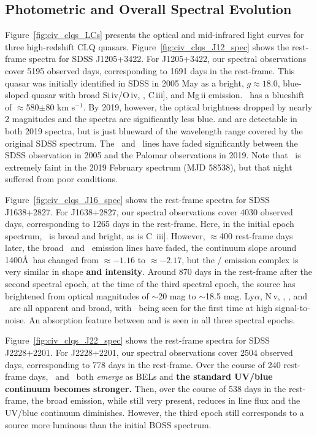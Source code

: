 \documentclass[fleqn,usenatbib]{mnras}
\begin{document}
\subsection{Photometric and Overall Spectral Evolution}
Figure~\ref{fig:civ_clqs_LCs} presents the optical and mid-infrared light
curves for three high-redshift CLQ quasars.
Figure~\ref{fig:civ_clqs_J12_spec} shows the rest-frame spectra for
SDSS J1205+3422.  For J1205+3422, our spectral observations cover 5195
observed days, corresponding to 1691 days in the rest-frame. This
quasar was initially identified in SDSS in 2005 May as a bright, $g
\approx 18.0$, blue-sloped quasar with broad Si\,{\sc iv}/O\,{\sc iv},
\civ, C\,{\sc iii}], and Mg\,{\sc ii} emission.  \civ\ has a blueshift of
$\approx$580$\pm$80 km s$^{-1}$.  By 2019, however, the optical
brightness dropped by nearly 2 magnitudes and the spectra are
significantly less blue.  \lya and \nv are detectable in both 2019
spectra, but is just blueward of the wavelength range covered by the
original SDSS spectrum. The \civ\ and \ciii\ lines have faded
significantly between the SDSS observation in 2005 and the Palomar
observations in 2019.  Note that \civ\ is extremely faint in the 2019
February spectrum (MJD 58538), but that night suffered from poor conditions.

Figure~\ref{fig:civ_clqs_J16_spec} shows the rest-frame spectra for
SDSS J1638+2827.  For J1638+2827, our spectral observations cover 4030
observed days, corresponding to 1265 days in the rest-frame. Here, in
the initial epoch spectrum, \civ\ is broad and bright, as is C\,{\sc
iii}]. However, $\approx$400 rest-frame days later, the broad \civ\ and
\ciii\ emission lines have faded, the continuum slope around 1400\AA\
has changed from $\approx-1.16$ to $\approx-2.17$, but the \lya/\nv
emission complex is very similar in shape {\bf and intensity}. Around
870 days in the rest-frame after the second spectral epoch, at the
time of the third spectral epoch, the source has brightened from
optical magnitudes of $\sim$20 mag to $\sim$18.5 mag. Ly$\alpha$,
N\,{\sc v}, \civ, \ciii, and \mgii\ are all apparent and broad, with
\mgii\ being seen for the first time at high signal-to-noise. An
absorption feature between \lya and \nv is seen in all three spectral
epochs.

Figure~\ref{fig:civ_clqs_J22_spec} shows the rest-frame spectra for
SDSS J2228+2201.  For J2228+2201, our spectral observations cover 2504
observed days, corresponding to 778 days in the rest-frame. Over the
course of 240 rest-frame days, \civ\ and \ciii\ both {\it emerge} as
BELs and {\bf the standard UV/blue continuum becomes stronger.}  Then,
over the course of 538 days in the rest-frame, the broad emission,
while still very present, reduces in line flux and the UV/blue continuum
diminishes.  However, the third epoch still corresponds to a source
more luminous than the initial BOSS spectrum.
\end{document}
